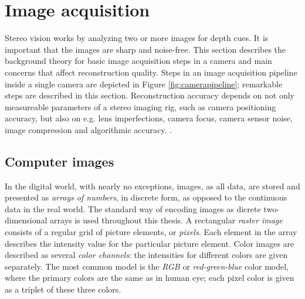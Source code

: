 


\section{Image acquisition} \label{sec:image-acquisition}



Stereo vision works by analyzing two or more images for depth cues.
It is important that the images are sharp and noise-free. \cite{szeliski10vision}
This section describes the background theory for basic image acquisition steps in a camera and main concerns that affect reconstruction quality.
Steps in an image acquisition pipeline inside a single camera are depicted in Figure \ref{fig:camerapipeline}; remarkable steps are described in this section.
Reconstruction accuracy depends on not only measureable parameters of a stereo imaging rig, such as camera positioning accuracy, but also on e.g. lens imperfections, camera focus, camera sensor noise, image compression and algorithmic accuracy. \cite{hollsten2013imagequality,kyto2011method,rieke2009evaluation}.



\subsection{Computer images} \label{sec:computer-images}

In the digital world, with nearly no exceptions, images, as all data, are stored and presented as \emph{arrays of numbers}, in discrete form, as opposed to the continuous data in the real world.
The standard way of encoding images as dicrete two-dimensional arrays is used throughout this thesis.
A rectangular \emph{raster image} consists of a regular grid of picture elements, or \emph{pixels}.
Each element in the array describes the intensity value for the particular picture element.
Color images are described as several \emph{color channels}: the intensities for different colors are given separately.
The most common model is the \emph{RGB} or \emph{red-green-blue} color model, where the primary colors are the same as in human eye; each pixel color is given as a triplet of these three colors.
\cite{pitas2000digital}

